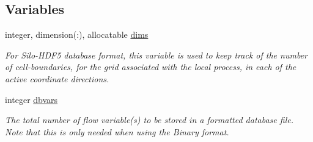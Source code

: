 \subsection*{Variables}
\begin{DoxyCompactItemize}
\item 
integer, dimension(\+:), allocatable \hyperlink{namespacem__data__output_a98d3ca969b0e32fa09436f1a9cfbd77c}{dims}
\begin{DoxyCompactList}\small\item\em For Silo-\/\+H\+D\+F5 database format, this variable is used to keep track of the number of cell-\/boundaries, for the grid associated with the local process, in each of the active coordinate directions. \end{DoxyCompactList}\item 
integer \hyperlink{namespacem__data__output_acc04177c6c6ab23be61767b187ece0ba}{dbvars}
\begin{DoxyCompactList}\small\item\em The total number of flow variable(s) to be stored in a formatted database file. Note that this is only needed when using the Binary format. \end{DoxyCompactList}\end{DoxyCompactItemize}
